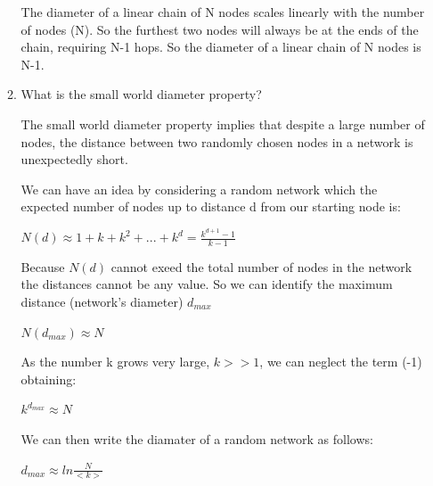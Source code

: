 \documentclass{amsart}
\theoremstyle{definition}
\theoremstyle{remark}
\numberwithin{equation}{section}
\begin{document}
\begin{enumerate}
\begin{enumerate}
\vspace{0.2cm}

The diameter of a linear chain of N nodes scales linearly with the number of nodes (N). So the furthest two nodes will always be at the ends of the chain, requiring N-1 hops. So the diameter of a linear chain of N nodes is N-1.

\vspace{0.2cm}

\item What is the small world diameter property? \vspace{0.5cm}

The small world diameter property implies that despite a large number of nodes, the distance between two randomly chosen nodes in a network is unexpectedly short.

\vspace{0.5cm}

We can have an idea by considering a random network which the expected number of nodes up to distance d from our starting node is:

\vspace{0.2cm}

$
N\left(d\right) \approx 1 + k + k^{2} + ... + k^{d} = \frac{k^{d+1} -1}{k -1}
$

\vspace{0.2cm}

Because $ N\left(d\right) $ cannot exeed the total number of nodes in the network the distances cannot be any value. So we can identify the maximum distance (network's diameter) $d_{max}$

\vspace{0.2cm}

$
N\left(d_{max}\right) \approx N
$

\vspace{0.2cm}

As the number k grows very large, $k >> 1$, we can neglect the term (-1) obtaining:

\vspace{0.2cm}

$
k^{d_{max}} \approx N
$

\vspace{0.2cm}

We can then write the diamater of a random network as follows:

\vspace{0.2cm}

$
d_{max} \approx ln \frac{N}{<k>}
$


\end{enumerate}
\end{enumerate}
\end{document}
